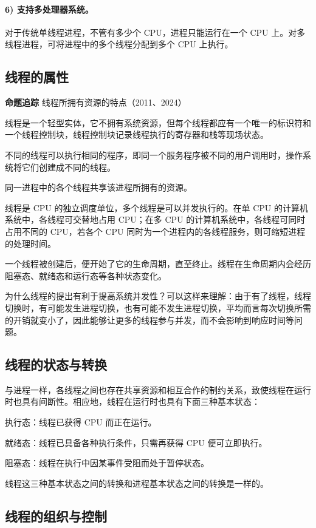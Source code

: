 \documentclass{ctexbook}
\begin{document}
	\paragraph{6) 支持多处理器系统。}
	对于传统单线程进程，不管有多少个 CPU，进程只能运行在一个 CPU 上。对多线程进程，可将进程中的多个线程分配到多个 CPU 上执行。
	
	\subsection{线程的属性}
	
	\textbf{命题追踪} 线程所拥有资源的特点（2011、2024）
	
	线程是一个轻型实体，它不拥有系统资源，但每个线程都应有一个唯一的标识符和一个线程控制块，线程控制块记录线程执行的寄存器和栈等现场状态。
	
	不同的线程可以执行相同的程序，即同一个服务程序被不同的用户调用时，操作系统将它们创建成不同的线程。
	
	同一进程中的各个线程共享该进程所拥有的资源。
	
	线程是 CPU 的独立调度单位，多个线程是可以并发执行的。在单 CPU 的计算机系统中，各线程可交替地占用 CPU；在多 CPU 的计算机系统中，各线程可同时占用不同的 CPU，若各个 CPU 同时为一个进程内的各线程服务，则可缩短进程的处理时间。
	
	一个线程被创建后，便开始了它的生命周期，直至终止。线程在生命周期内会经历阻塞态、就绪态和运行态等各种状态变化。
	
	为什么线程的提出有利于提高系统并发性？可以这样来理解：由于有了线程，线程切换时，有可能发生进程切换，也有可能不发生进程切换，平均而言每次切换所需的开销就变小了，因此能够让更多的线程参与并发，而不会影响到响应时间等问题。
	
	\subsection{线程的状态与转换}
	
	与进程一样，各线程之间也存在共享资源和相互合作的制约关系，致使线程在运行时也具有间断性。相应地，线程在运行时也具有下面三种基本状态：
	
执行态：线程已获得 CPU 而正在运行。

就绪态：线程已具备各种执行条件，只需再获得 CPU 便可立即执行。

阻塞态：线程在执行中因某事件受阻而处于暂停状态。
	
	线程这三种基本状态之间的转换和进程基本状态之间的转换是一样的。
	
	\subsection{线程的组织与控制}
	
\end{document}
